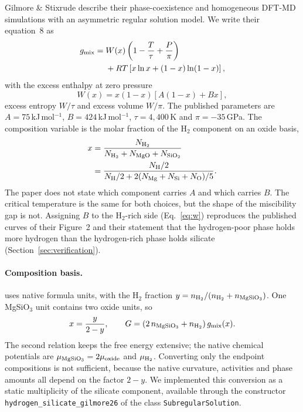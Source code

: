 Gilmore \& Stixrude \cite{gilmore2026} describe their phase-coexistence and homogeneous
DFT-MD simulations with an asymmetric regular solution model. We write their equation~8 as
\begin{equation}
\begin{split}
g_{\rm mix} ={}& W(x)\left(1-\frac{T}{\tau}+\frac{P}{\pi}\right)\\
 &+ RT\left[x\ln x + (1-x)\ln(1-x)\right],
\end{split}
\label{eq:gs26}
\end{equation}
with the excess enthalpy at zero pressure
\begin{equation}
W(x) = x(1-x)\left[A(1-x)+Bx\right],
\label{eq:w}
\end{equation}
excess entropy $W/\tau$ and excess volume $W/\pi$. The published parameters are
$A = 75$\,kJ\,mol$^{-1}$, $B = 424$\,kJ\,mol$^{-1}$, $\tau = 4{,}400$\,K and
$\pi = -35$\,GPa. The composition variable is the molar fraction of the H$_2$ component on an
oxide basis,
\begin{equation}
\begin{split}
x &= \frac{N_{\rm H_2}}{N_{\rm H_2}+N_{\rm MgO}+N_{\rm SiO_2}}\\
  &= \frac{N_{\rm H}/2}{N_{\rm H}/2 + 2(N_{\rm Mg}+N_{\rm Si}+N_{\rm O})/5}.
\end{split}
\label{eq:x}
\end{equation}
The paper does not state which component carries $A$ and which carries $B$. The critical
temperature is the same for both choices, but the shape of the miscibility gap is not.
Assigning $B$ to the H$_2$-rich side (Eq.~\ref{eq:w}) reproduces the published curves of
their Figure~2 and their statement that the hydrogen-poor phase holds more hydrogen than the
hydrogen-rich phase holds silicate (Section~\ref{sec:verification}).

\paragraph{Composition basis.} \Atm{} uses native formula units, with the H$_2$ fraction
$y = n_{\rm H_2}/(n_{\rm H_2}+n_{\rm MgSiO_3})$. One MgSiO$_3$ unit contains two oxide units,
so
\begin{equation}
x = \frac{y}{2-y}, \qquad
G = \left(2\,n_{\rm MgSiO_3} + n_{\rm H_2}\right) g_{\rm mix}(x).
\label{eq:basis}
\end{equation}
The second relation keeps the free energy extensive; the native chemical potentials are
$\mu_{\rm MgSiO_3} = 2\mu_{\rm oxide}$ and $\mu_{\rm H_2}$. Converting only the endpoint
compositions is not sufficient, because the native curvature, activities and phase amounts
all depend on the factor $2-y$. We implemented this conversion as a static multiplicity of
the silicate component, available through the constructor
\texttt{hydrogen\_silicate\_gilmore26} of the class \texttt{SubregularSolution}.


